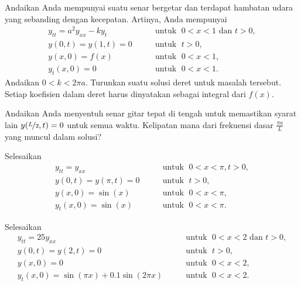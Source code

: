 \begin{exercise}[menantang]
Andaikan Anda mempunyai suatu senar bergetar dan
terdapat hambatan udara yang sebanding dengan kecepatan.  Artinya, Anda mempunyai
\begin{equation*}
\begin{array}{ll}
y_{tt} = a^2 y_{xx} - k y_t  & \qquad \text{untuk } \; 0 < x < 1 \text{ dan } t > 0,  \\
y(0,t) = y(1,t) = 0 & \qquad \text{untuk } \; t > 0, \\
y(x,0) = f(x) & \qquad \text{untuk } \; 0 < x < 1 , \\
y_t(x,0) = 0 & \qquad \text{untuk } \; 0 < x < 1 .
\end{array}
\end{equation*}
Andaikan $0 < k < 2 \pi a$.
Turunkan suatu solusi deret untuk masalah tersebut.  Setiap koefisien dalam deret
harus dinyatakan sebagai integral dari $f(x)$.
\end{exercise}

\begin{exercise}
Andaikan Anda menyentuh senar gitar tepat di tengah untuk
memastikan syarat lain $y(\nicefrac{L}{2},t) = 0$ untuk semua waktu.
Kelipatan mana dari frekuensi dasar $\frac{\pi a}{L}$
yang muncul dalam solusi?
\end{exercise}

\setcounter{exercise}{100}

\begin{exercise}
Selesaikan
\begin{equation*}
\begin{array}{ll}
y_{tt} = y_{xx}  & \qquad \text{untuk } \; 0 < x < \pi, t > 0,  \\
y(0,t) = y(\pi,t) = 0 & \qquad \text{untuk } \; t > 0,  \\
y(x,0) = \sin(x) & \qquad \text{untuk } \; 0 < x < \pi , \\
y_t(x,0) = \sin(x) & \qquad \text{untuk } \; 0 < x < \pi .
\end{array}
\end{equation*}
\end{exercise}

\begin{exercise}
Selesaikan
\begin{equation*}
\begin{array}{ll}
y_{tt} = 25 y_{xx} & \qquad \text{untuk } \; 0 < x < 2 \text{ dan } t > 0,  \\
y(0,t) = y(2,t) = 0 & \qquad \text{untuk } \; t > 0, \\
y(x,0) = 0 & \qquad \text{untuk } \; 0 < x < 2 , \\
y_t(x,0) = \sin(\pi x) + 0.1 \sin(2\pi x) & \qquad \text{untuk } \; 0 < x < 2 .
\end{array}
\end{equation*}
\end{exercise}

